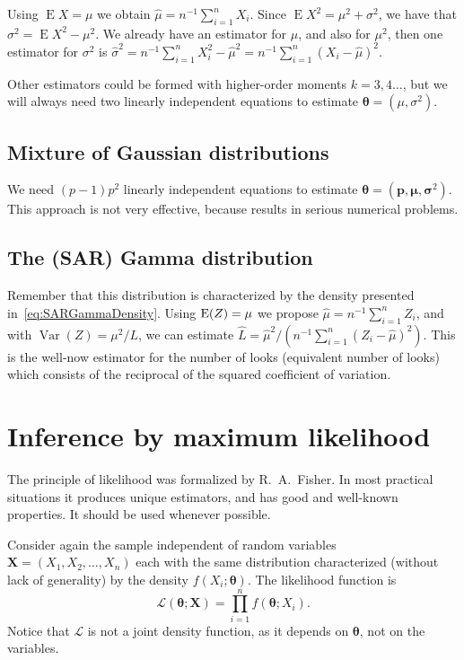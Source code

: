 Using $\operatorname{E}X=\mu$ we obtain $\widehat{\mu}=n^{-1}\sum_{i=1}^{n} X_i$.
Since $\operatorname{E}X^2=\mu^2+\sigma^2$, we have that $\sigma^2=\operatorname{E}X^2-\mu^2$.
We already have an estimator for $\mu$, and also for $\mu^2$, then one estimator for $\sigma^2$ is $\widehat{\sigma}^2=n^{-1}\sum_{i=1}^{n}X_i^2-\widehat{\mu}^2 = n^{-1}\sum_{i=1}^{n}(X_i-\widehat{\mu})^2$.

Other estimators could be formed with higher-order moments $k=3,4\dots$, but we will always need two linearly independent equations to estimate $\bm\theta=(\mu,\sigma^2)$.

\subsection{Mixture of Gaussian distributions}\label{Sec:MixtureGaussian}

We need $(p-1)p^2$ linearly independent equations to estimate $\bm{\theta} = (\bm p, \bm \mu, \bm \sigma^2)$.
This approach is not very effective, because results in serious numerical problems.

\subsection{The (SAR) Gamma distribution}

Remember that this distribution is characterized by the density presented in~\eqref{eq:SARGammaDensity}.
Using $\operatorname{E}(Z)=\mu$ we propose $\widehat{\mu}=n^{-1}\sum_{i=1}^n Z_i$,
and with 
$\operatorname{Var}(Z)=\mu^2/L$, we can estimate $\widehat L=\widehat{\mu}^2 / (n^{-1}\sum_{i=1}^n (Z_i - \widehat{\mu})^2)$.
This is the well-now estimator for the number of looks (equivalent number of looks) which consists of the reciprocal of the squared coefficient of variation.

\section{Inference by maximum likelihood}

The principle of likelihood was formalized by R.\ A.\ Fisher.
In most practical situations it produces unique estimators, and has good and well-known properties.
It should be used whenever possible.

Consider again the sample independent of random variables $\bm X = (X_1,X_2,\dots,X_n)$ each with the same distribution characterized (without lack of generality) by the density $f(X_i;\bm \theta)$.
The likelihood function is
\begin{equation}
\mathcal L(\bm \theta;\bm X) = \prod_{i=1}^{n} f(\bm \theta;X_i).
\label{eq:Likelihood}
\end{equation}
Notice that $\mathcal L$ is not a joint density function, as it depends on $\bm \theta$, not on the variables.

